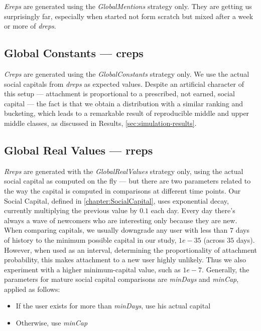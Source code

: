 \documentclass[10pt,oneside]{memoir}
\begin{document}
{\itshape Ereps} are generated using the {\itshape GlobalMentions} strategy only.  They are getting us surprisingly far, especially when started not form scratch but mixed after a week or more of {\itshape dreps}.


\subsection{Global Constants --- creps}
\label{globalconstantscreps}

{\itshape Creps} are generated using the {\itshape GlobalConstants} strategy only.  We use the actual social capitals from {\itshape dreps} as expected values.  Despite an artificial character of this setup --- attachment is proportional to a prescribed, not earned, social capital --- the fact is that we obtain a distribution with a similar ranking and bucketing, which leads to a remarkable result of reproducible middle and upper middle classes, as discussed in Results, \ref{sec:simulation-results}.


\subsection{Global Real Values --- rreps}
\label{globalrealvaluesrreps}

{\itshape Rreps} are generated with the {\itshape GlobalRealValues} strategy only, using the actual social capital as computed on the fly --- but there are two parameters related to the way the capital is computed in comparisons at different time points.  Our Social Capital, defined in \ref{chapter:SocialCapital}, uses exponential decay, currently multiplying the previous value by $0.1$ each day.  Every day there's always a wave of newcomers who are interesting only because they are new.  When comparing capitals, we usually downgrade any user with less than $7$ days of history to the minimum possible capital in our study, $1e-35$ (across $35$ days).  However, when used as an interval, determining the proportionality of attachment probability, this makes attachment to a new user highly unlikely.  Thus we also experiment with a higher minimum-capital value, such as $1e-7$.  Generally, the parameters for mature social capital comparisons are {\itshape minDays} and {\itshape minCap}, applied as follows:


\begin{itemize}


\item If the user exists for more than {\itshape minDays}, use his actual capital

\item Otherwise, use {\itshape minCap}
\end{itemize}
\end{document}
